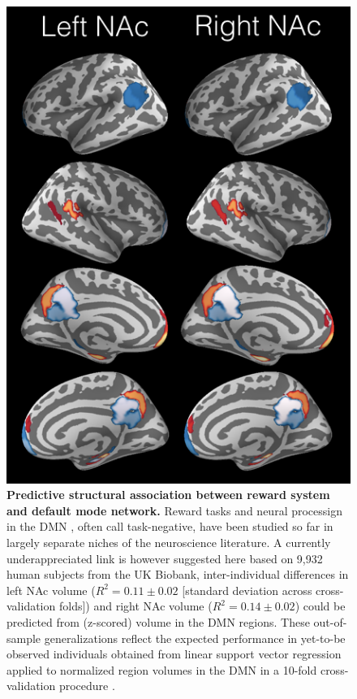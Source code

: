 \documentclass[10pt,letterpaper]{article}
\begin{document}
\begin{figure}[!htbp]
  \begin{minipage}[c]{0.63\textwidth}
    \includegraphics[width=.8\linewidth]{fig_dmn.png}
  \end{minipage}
  \hspace{-4em}
  \begin{minipage}[c]{0.45\textwidth}
    \caption{\textbf{Predictive structural association between reward system and
        default mode network.} Reward tasks \citep{doherty2015structure} and neural processign in the DMN \citep{randy2008}, often call task-negative, have been studied so far in largely separate niches of the neuroscience literature. A currently underappreciated link is however suggested here based on 9,932 human subjects from the UK Biobank, inter-individual differences in left NAc volume ($R^2=0.11 \pm 0.02$ [standard deviation across cross-validation folds]) and right NAc volume ($R^2=0.14 \pm 0.02$) could be predicted from (z-scored) volume in the DMN regions. These out-of-sample generalizations reflect the expected performance in yet-to-be observed individuals obtained from linear support vector regression applied to normalized region volumes in the DMN in a 10-fold cross-validation procedure \citep{hastie}.
}
\end{minipage}
\end{figure}
\end{document}
